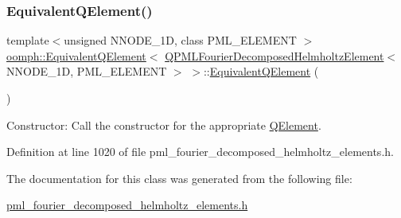 \subsubsection{\texorpdfstring{Equivalent\+Q\+Element()}{EquivalentQElement()}}
{\footnotesize\ttfamily template$<$unsigned N\+N\+O\+D\+E\+\_\+1D, class P\+M\+L\+\_\+\+E\+L\+E\+M\+E\+NT $>$ \\
\hyperlink{classoomph_1_1EquivalentQElement}{oomph\+::\+Equivalent\+Q\+Element}$<$ \hyperlink{classoomph_1_1QPMLFourierDecomposedHelmholtzElement}{Q\+P\+M\+L\+Fourier\+Decomposed\+Helmholtz\+Element}$<$ N\+N\+O\+D\+E\+\_\+1D, P\+M\+L\+\_\+\+E\+L\+E\+M\+E\+NT $>$ $>$\+::\hyperlink{classoomph_1_1EquivalentQElement}{Equivalent\+Q\+Element} (\begin{DoxyParamCaption}{ }\end{DoxyParamCaption})\hspace{0.3cm}{\ttfamily [inline]}}



Constructor\+: Call the constructor for the appropriate \hyperlink{classoomph_1_1QElement}{Q\+Element}. 



Definition at line 1020 of file pml\+\_\+fourier\+\_\+decomposed\+\_\+helmholtz\+\_\+elements.\+h.



The documentation for this class was generated from the following file\+:\begin{DoxyCompactItemize}
\item 
\hyperlink{pml__fourier__decomposed__helmholtz__elements_8h}{pml\+\_\+fourier\+\_\+decomposed\+\_\+helmholtz\+\_\+elements.\+h}\end{DoxyCompactItemize}
